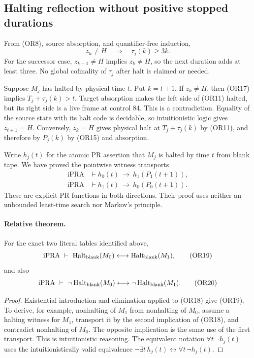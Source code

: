 \subsection{Halting reflection without positive stopped durations}

From (OR8), source absorption, and quantifier-free induction,
\[
 z_k\ne H\quad\Longrightarrow\quad\tau_j(k)\ge3k.
 \tag{OR17}
\]
For the successor case, $z_{k+1}\ne H$ implies $z_k\ne H$,
so the next duration adds at least three.  No global cofinality
of $\tau_j$ after halt is claimed or needed.

Suppose $M_j$ has halted by physical time $t$.  Put $k=t+1$.
If $z_k\ne H$, then (OR17) implies
$T_j+\tau_j(k)>t$.  Target absorption makes the left side of
(OR11) halted, but its right side is a live frame at control 84.
This is a contradiction.  Equality of the source state with its
halt code is decidable, so intuitionistic logic gives $z_{t+1}=H$.
Conversely, $z_k=H$ gives physical halt at $T_j+\tau_j(k)$
by (OR11), and therefore by $P_j(k)$ by (OR15) and absorption.

Write $h_j(t)$ for the atomic PR assertion that $M_j$ is halted
by time $t$ from blank tape.  We have proved the pointwise witness
transports
\begin{align*}
 \mathrm{iPRA}&\vdash h_0(t)\ \longrightarrow\ h_1(P_1(t+1)),\\
 \mathrm{iPRA}&\vdash h_1(t)\ \longrightarrow\ h_0(P_0(t+1)).
 \tag{OR18}
\end{align*}
These are explicit PR functions in both directions.  Their proof
uses neither an unbounded least-time search nor Markov's principle.

\paragraph{Relative theorem.}
For the exact two literal tables identified above,
\[
 \mathrm{iPRA}\ \vdash\
 \operatorname{Halt}_{\rm blank}(M_0)
   \longleftrightarrow\operatorname{Halt}_{\rm blank}(M_1),
 \tag{OR19}
\]
and also
\[
 \mathrm{iPRA}\ \vdash\
 \neg\operatorname{Halt}_{\rm blank}(M_0)
   \longleftrightarrow\neg\operatorname{Halt}_{\rm blank}(M_1).
 \tag{OR20}
\]
\begin{proof}
Existential introduction and elimination applied to (OR18) give
(OR19).  To derive, for example, nonhalting of $M_1$ from nonhalting
of $M_0$, assume a halting witness for $M_1$, transport it by the
second implication of (OR18), and contradict nonhalting of $M_0$.
The opposite implication is the same use of the first transport.
This is intuitionistic reasoning.  The equivalent notation
$\forall t\,\neg h_j(t)$ uses the intuitionistically valid
equivalence $\neg\exists t\,h_j(t)\leftrightarrow\forall t\,\neg h_j(t)$.
\end{proof}

